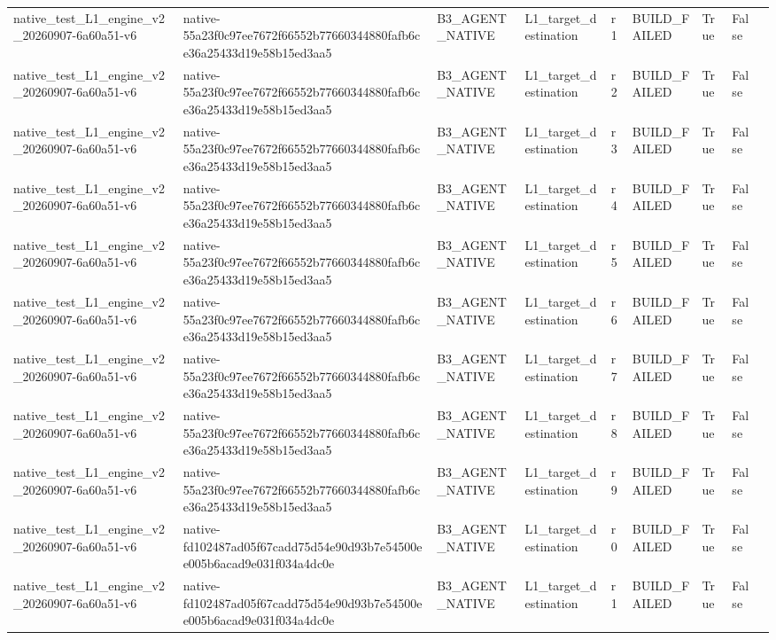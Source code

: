 \begin{tabular}{lllllllll}
native\_test\_L1\_engine\_v2\_20260907-6a60a51-v6 & native-55a23f0c97ee7672f66552b77660344880fafb6ce36a25433d19e58b15ed3aa5 & B3\_AGENT\_NATIVE & L1\_target\_destination & r1 & BUILD\_FAILED & True & False &  \\
native\_test\_L1\_engine\_v2\_20260907-6a60a51-v6 & native-55a23f0c97ee7672f66552b77660344880fafb6ce36a25433d19e58b15ed3aa5 & B3\_AGENT\_NATIVE & L1\_target\_destination & r2 & BUILD\_FAILED & True & False &  \\
native\_test\_L1\_engine\_v2\_20260907-6a60a51-v6 & native-55a23f0c97ee7672f66552b77660344880fafb6ce36a25433d19e58b15ed3aa5 & B3\_AGENT\_NATIVE & L1\_target\_destination & r3 & BUILD\_FAILED & True & False &  \\
native\_test\_L1\_engine\_v2\_20260907-6a60a51-v6 & native-55a23f0c97ee7672f66552b77660344880fafb6ce36a25433d19e58b15ed3aa5 & B3\_AGENT\_NATIVE & L1\_target\_destination & r4 & BUILD\_FAILED & True & False &  \\
native\_test\_L1\_engine\_v2\_20260907-6a60a51-v6 & native-55a23f0c97ee7672f66552b77660344880fafb6ce36a25433d19e58b15ed3aa5 & B3\_AGENT\_NATIVE & L1\_target\_destination & r5 & BUILD\_FAILED & True & False &  \\
native\_test\_L1\_engine\_v2\_20260907-6a60a51-v6 & native-55a23f0c97ee7672f66552b77660344880fafb6ce36a25433d19e58b15ed3aa5 & B3\_AGENT\_NATIVE & L1\_target\_destination & r6 & BUILD\_FAILED & True & False &  \\
native\_test\_L1\_engine\_v2\_20260907-6a60a51-v6 & native-55a23f0c97ee7672f66552b77660344880fafb6ce36a25433d19e58b15ed3aa5 & B3\_AGENT\_NATIVE & L1\_target\_destination & r7 & BUILD\_FAILED & True & False &  \\
native\_test\_L1\_engine\_v2\_20260907-6a60a51-v6 & native-55a23f0c97ee7672f66552b77660344880fafb6ce36a25433d19e58b15ed3aa5 & B3\_AGENT\_NATIVE & L1\_target\_destination & r8 & BUILD\_FAILED & True & False &  \\
native\_test\_L1\_engine\_v2\_20260907-6a60a51-v6 & native-55a23f0c97ee7672f66552b77660344880fafb6ce36a25433d19e58b15ed3aa5 & B3\_AGENT\_NATIVE & L1\_target\_destination & r9 & BUILD\_FAILED & True & False &  \\
native\_test\_L1\_engine\_v2\_20260907-6a60a51-v6 & native-fd102487ad05f67cadd75d54e90d93b7e54500ee005b6acad9e031f034a4dc0e & B3\_AGENT\_NATIVE & L1\_target\_destination & r0 & BUILD\_FAILED & True & False &  \\
native\_test\_L1\_engine\_v2\_20260907-6a60a51-v6 & native-fd102487ad05f67cadd75d54e90d93b7e54500ee005b6acad9e031f034a4dc0e & B3\_AGENT\_NATIVE & L1\_target\_destination & r1 & BUILD\_FAILED & True & False &  \\

\end{tabular}
